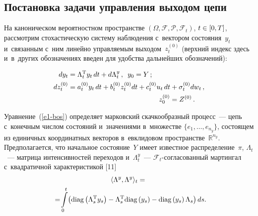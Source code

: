 \begin{multicols}{2}
\vspace*{-8pt}
     
\section{Постановка задачи управления выходом цепи}

\vspace*{-2pt}

     На каноническом вероятностном пространстве $(\Omega, 
\mathcal{F},\mathcal{P}, \mathcal{F}_t)$, $t\hm\in [0,T]$, рассмотрим 
стохастическую систему наблюдения с~вектором состояния~$y_t$ 
и~связанным с~ним линейно управляемым выходом~$z_t^{(0)}$ (верхний 
индекс здесь и~в~других обозначениях введен для удобства дальнейших 
обозначений):

\vspace*{-2pt}

\noindent
     \begin{align}
     dy_t&= \Lambda_t^{\mathrm{T}} y_t\, dt+d\Lambda_t^y\,,\enskip y_0=Y\,;  
\label{e1-bos} \\
     dz_t^{(0)} &= a_t^{(0)} y_t\,dt+b_t^{(0)} z_t^{(0)}dt+c_t^{(0)}u_t\,dt 
+\sigma_t^{(0)}dw_t\,,\notag\\
&\hspace*{46mm}z_0^{(0)}=Z^{(0)}\,.
     \label{e2-bos}
     \end{align}
     
     
     Уравнение~(\ref{e1-bos}) определяет марковский скачкообразный 
процесс~--- цепь с~конечным числом состояний и~значениями в~множестве 
     $\{ e_1, \ldots , e_{n_y}\}$, состоящем из единичных координатных 
векторов в~евклидовом пространстве~$\mathbb{R}^{n_y}$. Предполагается, 
что начальное состояние~$Y$ имеет известное распределение~$\pi$, 
$\Lambda_t$~--- матрица интенсивностей переходов и~$\Lambda_t^y$~---  
$\mathcal{F}_t$-со\-гла\-со\-ван\-ный мартингал с~квадратичной 
характеристикой [11]
    \begin{multline*}
     \langle \Lambda^y, \Lambda^y\rangle_t ={}\\
     {}=\!\int\limits_0^t \!\left(\mathrm{diag}\left( 
\Lambda_s^{\mathrm{T}} y_s\right) -\Lambda_s^{\mathrm{T}} \mathrm{diag} \left( y_s\right) -\mathrm{diag}\left( y_s\right) 
\Lambda_s \right) ds.\hspace*{-2.25598pt}
   \end{multline*}
   

\end{multicols}

